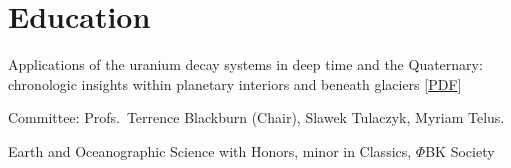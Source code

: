 \section{Education}

Applications of the uranium decay systems in deep time and the Quaternary: chronologic insights within planetary interiors and beneath glaciers [\href{https://escholarship.org/uc/item/0vp7r59z}{PDF}]

\quad Committee: Profs.~Terrence Blackburn (Chair), Slawek Tulaczyk, Myriam Telus.

Earth and Oceanographic Science with Honors, minor in Classics, $\Phi$BK Society